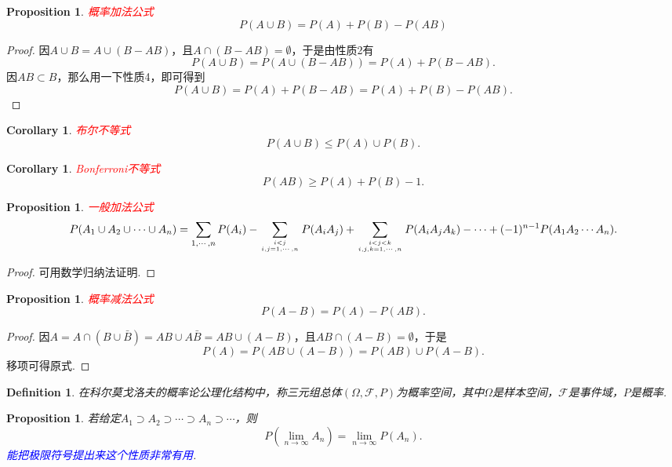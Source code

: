 \documentclass{article}
\newtheorem{corollary}[theorem]{Corollary}
\newtheorem{proposition}[theorem]{Proposition}
\newtheorem{definition}[theorem]{Definition}
\newcommand{\redt}[1]{\textcolor{red}{#1}}
\newcommand{\bluet}[1]{\textcolor{blue}{#1}}
\begin{document}
\begin{proposition}
\rm \redt{概率加法公式}
$$
P(A \cup B) = P(A) + P(B) - P(AB) 
$$
\end{proposition}

\begin{proof}
因$A \cup B = A \cup (B - AB)$，且$A \cap (B-AB) = \emptyset$，于是由性质2有
$$
P(A \cup B) = P(A \cup (B-AB)) = P(A) + P(B-AB).
$$
因$AB \subset B$，那么用一下性质4，即可得到
$$
P(A \cup B) = P(A) + P(B-AB) = P(A) + P(B) - P(AB).
$$
\end{proof}

\begin{corollary}
\rm \redt{布尔不等式}
$$
P(A \cup B) \leq P(A) \cup P(B).
$$
\end{corollary}

\begin{corollary}
\rm \redt{Bonferroni不等式}
$$
P(AB) \geq P(A) + P(B) -1.
$$
\end{corollary}

\begin{proposition}
\rm \redt{一般加法公式}
$$
P(A_1 \cup A_2 \cup \cdots \cup A_n) = \sum\limits_{1,\cdots,n} P(A_i) - \sum\limits_{i < j \atop i,j = 1,\cdots,n}P(A_iA_j) +  \sum\limits_{i < j < k \atop i,j,k = 1,\cdots,n}P(A_iA_jA_k) - \cdots + (-1)^{n-1}P(A_1A_2\cdots A_n). 
$$
\end{proposition}

\begin{proof}
可用数学归纳法证明. 
\end{proof}

\begin{proposition}
\rm \redt{概率减法公式} 
$$
P(A - B) = P(A) - P(AB).
$$
\end{proposition}

\begin{proof}
因$A = A\cap (B \cup \bar{B}) = AB \cup A\bar{B} = AB \cup (A-B)$，且$AB \cap (A-B) = \emptyset$，于是
$$
P(A) = P(AB \cup (A-B)) = P(AB) \cup P(A-B). 
$$
移项可得原式. 
\end{proof}

\begin{definition}
\rm 在科尔莫戈洛夫的概率论公理化结构中，称三元组总体$(\Omega,\mathscr{F}, P)$为{\color{red}概率空间}，其中$\Omega$是样本空间，$\mathscr{F}$是事件域，$P$是概率. 
\end{definition}


\begin{proposition}\label{probability-axiom: lemma1}
\rm 若给定$A_1 \supset A_2 \supset \cdots \supset A_n \supset \cdots$，则
$$
P(\lim\limits_{n \to \infty} A_n) = \lim\limits_{n \to \infty} P(A_n). 
$$
\bluet{能把极限符号提出来这个性质非常有用}. 
\end{proposition}
\end{document}
